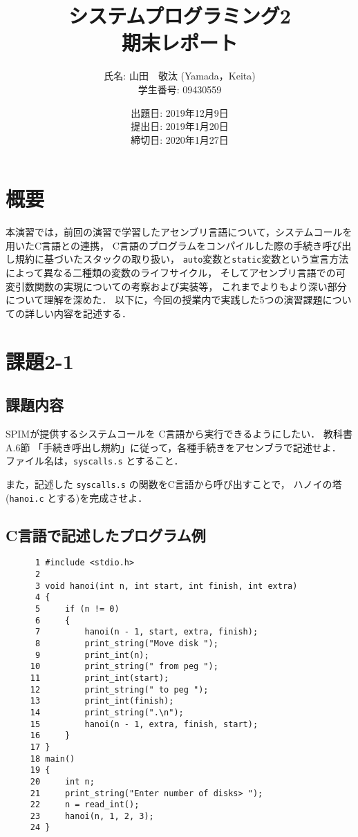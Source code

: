 \documentclass[a4j,11pt]{jarticle}
\title{システムプログラミング2 \\
       期末レポート}
\author{氏名: 山田　敬汰 (Yamada，Keita) \\
        学生番号: 09430559}
\date{出題日: 2019年12月9日 \\   %
      提出日: 2019年1月20日 \\
      締切日: 2020年1月27日 \\}  %
\begin{document}
\maketitle


\section{概要}

本演習では，前回の演習で学習したアセンブリ言語について，システムコールを用いたC言語との連携，
C言語のプログラムをコンパイルした際の手続き呼び出し規約に基づいたスタックの取り扱い，
{\tt auto}変数と{\tt static}変数という宣言方法によって異なる二種類の変数のライフサイクル，
そしてアセンブリ言語での可変引数関数の実現についての考察および実装等，
これまでよりもより深い部分について理解を深めた．
以下に，今回の授業内で実践した5つの演習課題についての詳しい内容を記述する．

\section{課題2-1}
\subsection{課題内容}
SPIMが提供するシステムコールを C言語から実行できるようにしたい． 教科書A.6節 「手続き呼出し規約」に従って，各種手続きをアセンブラで記述せよ． ファイル名は，{\tt syscalls.s} とすること．

また，記述した {\tt syscalls.s} の関数をC言語から呼び出すことで， ハノイの塔({\tt hanoi.c} とする)を完成させよ．

\subsection{C言語で記述したプログラム例}

\begin{verbatim}
      1	#include <stdio.h>
      2	
      3	void hanoi(int n, int start, int finish, int extra)
      4	{
      5	    if (n != 0)
      6	    {
      7	        hanoi(n - 1, start, extra, finish);
      8	        print_string("Move disk ");
      9	        print_int(n);
     10	        print_string(" from peg ");
     11	        print_int(start);
     12	        print_string(" to peg ");
     13	        print_int(finish);
     14	        print_string(".\n");
     15	        hanoi(n - 1, extra, finish, start);
     16	    }
     17	}
     18	main()
     19	{
     20	    int n;
     21	    print_string("Enter number of disks> ");
     22	    n = read_int();
     23	    hanoi(n, 1, 2, 3);
     24	}     
\end{verbatim}
\end{document}
